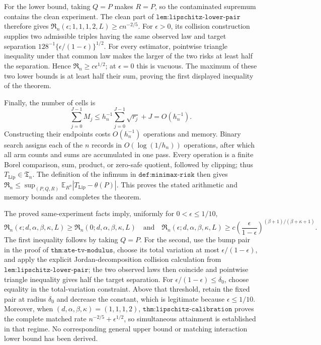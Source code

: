 For the lower bound, taking \(Q=P\) makes \(R=P\), so the contaminated supremum contains the clean experiment.  The clean part of \(\texttt{lem:lipschitz-lower-pair}\) therefore gives \(\mathfrak R_n(\epsilon;1,1,1,2,L)\geq c n^{-2/5}\).  For \(\epsilon>0\), its collision construction supplies two admissible triples having the same observed law and target separation \(128^{-1}\{\epsilon/(1-\epsilon)\}^{1/2}\).  For every estimator, pointwise triangle inequality under that common law makes the larger of the two risks at least half the separation.  Hence \(\mathfrak R_n\geq c\epsilon^{1/2}\); at \(\epsilon=0\) this is vacuous.  The maximum of these two lower bounds is at least half their sum, proving the first displayed inequality of the theorem.

Finally, the number of cells is
\[
 \sum_{j=0}^{J-1}M_j
 \leq h_n^{-1}\sum_{j=0}^{J-1}\sqrt{r_j}+J=O(h_n^{-1}).
\]
Constructing their endpoints costs \(O(h_n^{-1})\) operations and memory.  Binary search assigns each of the \(n\) records in \(O(\log(1/h_n))\) operations, after which all arm counts and sums are accumulated in one pass.  Every operation is a finite Borel comparison, sum, product, or zero-safe quotient, followed by clipping; thus \(T_{\mathrm{Lip}}\in\mathfrak T_n\).  The definition of the infimum in \(\texttt{def:minimax-risk}\) then gives \(\mathfrak R_n\leq\sup_{(P,Q,R)}\mathbb E_{R^n}|T_{\mathrm{Lip}}-\theta(P)|\).  This proves the stated arithmetic and memory bounds and completes the theorem.

The proved same-experiment facts imply, uniformly for \(0<\epsilon\leq1/10\),
\[
 \mathfrak R_n(\epsilon;d,\alpha,\beta,\kappa,L)
 \geq \mathfrak R_n(0;d,\alpha,\beta,\kappa,L)
 \quad\text{and}\quad
 \mathfrak R_n(\epsilon;d,\alpha,\beta,\kappa,L)
 \geq c\left(\frac{\epsilon}{1-\epsilon}\right)^{(\beta+1)/(\beta+\kappa+1)}.
\]
The first inequality follows by taking \(Q=P\).  For the second, use the bump pair in the proof of \(\texttt{thm:ate-tv-modulus}\), choose its total variation at most \(\epsilon/(1-\epsilon)\), and apply the explicit Jordan-decomposition collision calculation from \(\texttt{lem:lipschitz-lower-pair}\); the two observed laws then coincide and pointwise triangle inequality gives half the target separation.  For \(\epsilon/(1-\epsilon)\leq\delta_0\), choose equality in the total-variation constraint.  Above that threshold, retain the fixed pair at radius \(\delta_0\) and decrease the constant, which is legitimate because \(\epsilon\leq1/10\).  Moreover, when \((d,\alpha,\beta,\kappa)=(1,1,1,2)\), \(\texttt{thm:lipschitz-calibration}\) proves the complete matched rate \(n^{-2/5}+\epsilon^{1/2}\), so simultaneous attainment is established in that regime.  No corresponding general upper bound or matching interaction lower bound has been derived.

